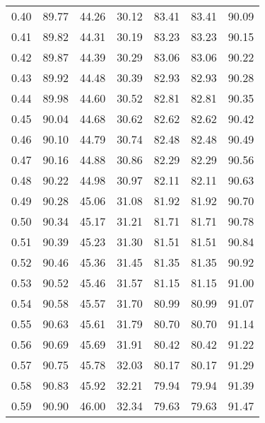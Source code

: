 \begin{tabular}{|c|c|c|c|c|c|c|}
      0.40 &     89.77 &     44.26 &      30.12 &   83.41 &      83.41 &         90.09 \\
      0.41 &     89.82 &     44.31 &      30.19 &   83.23 &      83.23 &         90.15 \\
      0.42 &     89.87 &     44.39 &      30.29 &   83.06 &      83.06 &         90.22 \\
      0.43 &     89.92 &     44.48 &      30.39 &   82.93 &      82.93 &         90.28 \\
      0.44 &     89.98 &     44.60 &      30.52 &   82.81 &      82.81 &         90.35 \\
      0.45 &     90.04 &     44.68 &      30.62 &   82.62 &      82.62 &         90.42 \\
      0.46 &     90.10 &     44.79 &      30.74 &   82.48 &      82.48 &         90.49 \\
      0.47 &     90.16 &     44.88 &      30.86 &   82.29 &      82.29 &         90.56 \\
      0.48 &     90.22 &     44.98 &      30.97 &   82.11 &      82.11 &         90.63 \\
      0.49 &     90.28 &     45.06 &      31.08 &   81.92 &      81.92 &         90.70 \\
      0.50 &     90.34 &     45.17 &      31.21 &   81.71 &      81.71 &         90.78 \\
      0.51 &     90.39 &     45.23 &      31.30 &   81.51 &      81.51 &         90.84 \\
      0.52 &     90.46 &     45.36 &      31.45 &   81.35 &      81.35 &         90.92 \\
      0.53 &     90.52 &     45.46 &      31.57 &   81.15 &      81.15 &         91.00 \\
      0.54 &     90.58 &     45.57 &      31.70 &   80.99 &      80.99 &         91.07 \\
      0.55 &     90.63 &     45.61 &      31.79 &   80.70 &      80.70 &         91.14 \\
      0.56 &     90.69 &     45.69 &      31.91 &   80.42 &      80.42 &         91.22 \\
      0.57 &     90.75 &     45.78 &      32.03 &   80.17 &      80.17 &         91.29 \\
      0.58 &     90.83 &     45.92 &      32.21 &   79.94 &      79.94 &         91.39 \\
      0.59 &     90.90 &     46.00 &      32.34 &   79.63 &      79.63 &         91.47 \\

\end{tabular}
